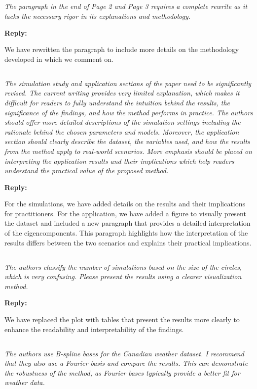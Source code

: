 \documentclass[12pt,a4paper]{article}
\newcommand{\comments}[1]{\subsection{}
\begin{mdframed}[style=comments] 
        \textit{#1}
\end{mdframed}}
\newcommand{\reply}[1]{
    \noindent\textbf{Reply:}

\begin{mdframed}[style=replies] 
    #1
\end{mdframed}
}
\begin{document}
\comments{The paragraph in the end of Page 2 and Page 3 requires a complete rewrite as it lacks the necessary rigor in its explanations and methodology.}

\reply{We have rewritten the paragraph to include more details on the methodology developed in \cite{happMultivariateFunctionalPrincipal2018} which we comment on.}

\comments{The simulation study and application sections of the paper need to be significantly revised. The current writing provides very limited explanation, which makes it difficult for readers to fully understand the intuition behind the results, the significance of the findings, and how the method performs in practice. The authors should offer more detailed descriptions of the simulation settings including the rationale behind the chosen parameters and models. Moreover, the application section should clearly describe the dataset, the variables used, and how the results from the method apply to real-world scenarios. More emphasis should be placed on interpreting the application results and their implications which help readers understand the practical value of the proposed method.}

\reply{For the simulations, we have added details on the results and their implications for practitioners.
For the application, we have added a figure to visually present the dataset and included a new paragraph that provides a detailed interpretation of the eigencomponents. This paragraph highlights how the interpretation of the results differs between the two scenarios and explains their practical implications.}

\comments{The authors classify the number of simulations based on the size of the circles, which is very confusing. Please present the results using a clearer visualization method.}

\reply{We have replaced the plot with tables that present the results more clearly to enhance the readability and interpretability of the findings.}

\comments{The authors use B-spline bases for the Canadian weather dataset. I recommend that they also use a Fourier basis and compare the results. This can demonstrate the robustness of the method, as Fourier bases typically provide a better fit for weather data.}
\end{document}
